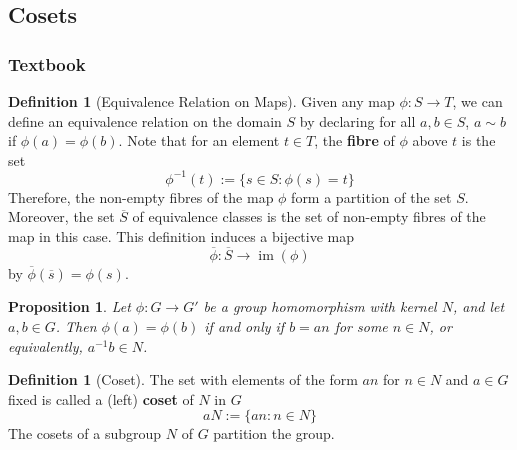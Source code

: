 \documentclass[12pt]{article}
\newtheorem{prop}[thm]{Proposition}
\theoremstyle{definition}
\newtheorem{defn}[thm]{Definition}
\theoremstyle{remark}
\numberwithin{equation}{section}
\newcommand\B[1]{\textbf{ #1}}
\DeclareMathOperator{\im}{im}
\begin{document}
\subsection{Cosets}


\subsubsection{Textbook}

\begin{defn}[Equivalence Relation on Maps]
        Given any map $\phi:S \rightarrow T$, we can define an equivalence relation on the domain $S$ by declaring for all $a,b \in S$, $a \sim b$ if $\phi(a) = \phi(b)$. Note that for an element $t \in T$, the \B{fibre} of $\phi$ above $t$ is the set \begin{equation}
                \phi^{-1}(t):= \{s \in S: \phi(s) = t\}
        \end{equation}
        Therefore, the non-empty fibres of the map $\phi$ form a partition of the set $S$. Moreover, the set $\overline{S}$ of equivalence classes is the set of non-empty fibres of the map in this case. This definition induces a bijective map \begin{equation}
                \overline{\phi}:\overline{S}\rightarrow \im(\phi)
        \end{equation}
        by $\overline{\phi}(\overline{s}) = \phi(s)$.
\end{defn}


\vspace{15pt}

\begin{prop}
        Let $\phi:G\rightarrow G'$ be a group homomorphism with kernel $N$, and let $a,b \in G$. Then $\phi(a) = \phi(b)$ if and only if $b = an$ for some $n \in N$, or equivalently, $a^{-1}b \in N$.
\end{prop}


\vspace{15pt}


\begin{defn}[Coset]
        The set with elements of the form $an$ for $n \in N$ and $a \in G$ fixed is called a (left) \B{coset} of $N$ in $G$ \begin{equation}
                aN:= \{an:n\in N\}
        \end{equation}
        The cosets of a subgroup $N$ of $G$ partition the group.
\end{defn}

\vspace{15pt}
\end{document}

